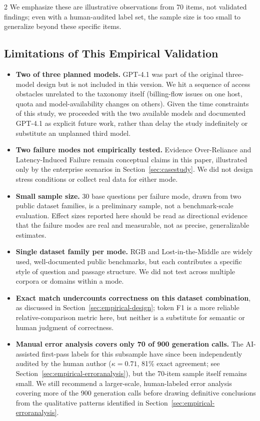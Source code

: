 \documentclass[11pt,a4paper]{article}
\begin{document}
\begin{multicols}{2}
We emphasize these are illustrative observations from 70 items, not validated findings; even with a human-audited label set, the sample size is too small to generalize beyond these specific items.

\subsection{Limitations of This Empirical Validation}
\label{sec:empirical-limitations}

\begin{itemize}[leftmargin=*,nosep]
\item \textbf{Two of three planned models.} GPT-4.1 was part of the original three-model design but is not included in this version. We hit a sequence of access obstacles unrelated to the taxonomy itself (billing-flow issues on one host, quota and model-availability changes on others). Given the time constraints of this study, we proceeded with the two available models and documented GPT-4.1 as explicit future work, rather than delay the study indefinitely or substitute an unplanned third model.
\item \textbf{Two failure modes not empirically tested.} Evidence Over-Reliance and Latency-Induced Failure remain conceptual claims in this paper, illustrated only by the enterprise scenarios in Section~\ref{sec:casestudy}. We did not design stress conditions or collect real data for either mode.
\item \textbf{Small sample size.} 30 base questions per failure mode, drawn from two public dataset families, is a preliminary sample, not a benchmark-scale evaluation. Effect sizes reported here should be read as directional evidence that the failure modes are real and measurable, not as precise, generalizable estimates.
\item \textbf{Single dataset family per mode.} RGB and Lost-in-the-Middle are widely used, well-documented public benchmarks, but each contributes a specific style of question and passage structure. We did not test across multiple corpora or domains within a mode.
\item \textbf{Exact match undercounts correctness on this dataset combination}, as discussed in Section~\ref{sec:empirical-design}; token F1 is a more reliable relative-comparison metric here, but neither is a substitute for semantic or human judgment of correctness.
\item \textbf{Manual error analysis covers only 70 of 900 generation calls.} The AI-assisted first-pass labels for this subsample have since been independently audited by the human author ($\kappa = 0.71$, 81\% exact agreement; see Section~\ref{sec:empirical-erroranalysis}), but the 70-item sample itself remains small. We still recommend a larger-scale, human-labeled error analysis covering more of the 900 generation calls before drawing definitive conclusions from the qualitative patterns identified in Section~\ref{sec:empirical-erroranalysis}.

\end{itemize}
\end{multicols}
\end{document}
